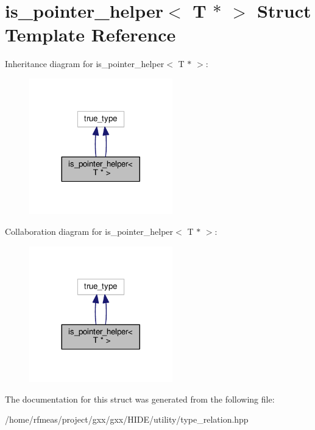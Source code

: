 \hypertarget{structis__pointer__helper_3_01T_01_5_01_4}{}\section{is\+\_\+pointer\+\_\+helper$<$ T $\ast$ $>$ Struct Template Reference}
\label{structis__pointer__helper_3_01T_01_5_01_4}


Inheritance diagram for is\+\_\+pointer\+\_\+helper$<$ T $\ast$ $>$\+:
\nopagebreak
\begin{figure}[H]
\begin{center}
\leavevmode
\includegraphics[width=176pt]{structis__pointer__helper_3_01T_01_5_01_4__inherit__graph}
\end{center}
\end{figure}


Collaboration diagram for is\+\_\+pointer\+\_\+helper$<$ T $\ast$ $>$\+:
\nopagebreak
\begin{figure}[H]
\begin{center}
\leavevmode
\includegraphics[width=176pt]{structis__pointer__helper_3_01T_01_5_01_4__coll__graph}
\end{center}
\end{figure}


The documentation for this struct was generated from the following file\+:\begin{DoxyCompactItemize}
\item 
/home/rfmeas/project/gxx/gxx/\+H\+I\+D\+E/utility/type\+\_\+relation.\+hpp\end{DoxyCompactItemize}
